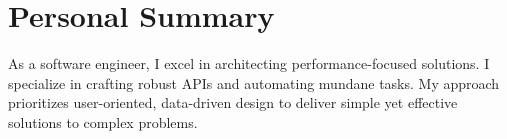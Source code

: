 \documentclass[10pt,a4paper,sans]{article}
\begin{document}
\pagestyle{empty}



\section*{ Personal Summary}
As a software engineer, I excel in architecting performance-focused solutions. I specialize in crafting robust APIs and automating mundane tasks. My approach prioritizes user-oriented, data-driven design to deliver simple yet effective solutions to complex problems.




\end{document}
